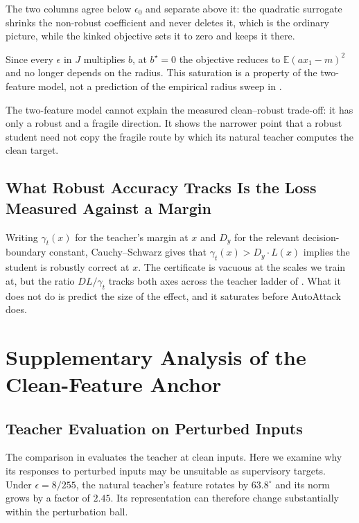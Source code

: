 \documentclass{article} %
\theoremstyle{plain}
\begin{document}
The two columns agree below $\epsilon_0$ and separate above it: the quadratic surrogate shrinks the
non-robust coefficient and never deletes it, which is the ordinary picture, while the kinked objective
sets it to zero and keeps it there.

Since every $\epsilon$ in $J$ multiplies $b$, at $b^\star=0$ the objective reduces to
$\mathbb{E}(a x_1-m)^2$ and no longer depends on the radius. This saturation is a property of the
two-feature model, not a prediction of the empirical radius sweep in .

The two-feature model cannot explain the measured clean--robust trade-off: it has only a robust and
a fragile direction. It shows the narrower point that a robust student need not copy the fragile
route by which its natural teacher computes the clean target.

\subsection{What Robust Accuracy Tracks Is the Loss Measured Against a Margin}

Writing $\gamma_t(x)$ for the teacher's margin at $x$ and $D_y$ for the relevant decision-boundary
constant, Cauchy--Schwarz gives that $\gamma_t(x) > D_y \cdot L(x)$ implies the student is robustly
correct at $x$. The certificate is vacuous at the scales we train at, but the ratio $D L/\gamma_t$
tracks both axes across the teacher ladder of . What it does not do is predict
the size of the effect, and it saturates before AutoAttack does.

\section{Supplementary Analysis of the Clean-Feature Anchor}
\label{app:anchor_analysis}

\subsection{Teacher Evaluation on Perturbed Inputs}
\label{app:teacher_diagnostics}

The comparison in  evaluates the teacher at clean inputs. Here we examine why its
responses to perturbed inputs may be unsuitable as supervisory targets. Under $\epsilon=8/255$,
the natural teacher's feature rotates by $63.8^\circ$ and its norm grows by a factor of $2.45$.
Its representation can therefore change substantially within the perturbation ball.
\end{document}
